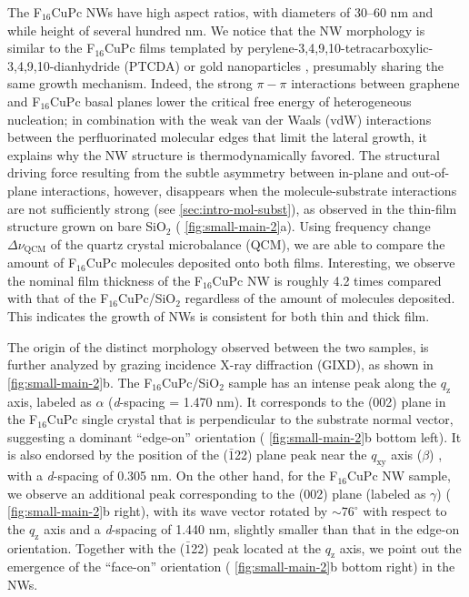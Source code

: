 The F\(_{\text{16}}\)CuPc NWs have high aspect ratios, with diameters of  30--60 nm and while height of  several hundred nm.
%
We notice that the NW morphology is similar to the
F\(_{\text{16}}\)CuPc films templated by
perylene-3,4,9,10-tetracarboxylic-3,4,9,10-dianhydride (PTCDA)
\cite{Yang_2009_F16_PTCDA} or gold nanoparticles
\cite{Mbenkum_2006_F16_1D}, presumably sharing the same growth
mechanism.
%
Indeed, the strong \(\pi-\pi\) interactions between
graphene and F\(_{\text{16}}\)CuPc basal planes lower the critical
free energy of heterogeneous nucleation; in combination with the weak
van der Waals (vdW) interactions between the perfluorinated molecular
edges that limit the lateral growth, it explains why the NW structure
is thermo\-dynamically favored.
%
The structural driving force resulting from the subtle asymmetry
between in-plane and out-of-plane interactions, however, disappears
when the molecule-substrate interactions are not sufficiently strong
(see \autoref{sec:intro-mol-subst}), as observed in the thin-film
structure grown on bare SiO\(_{\text{2}}\) (
\autoref{fig:small-main-2}a).
%
 Using frequency change $\Delta \nu_{\mathrm{QCM}}$ of the quartz crystal
micro\-balance (QCM), we are able to compare the amount of
F$_{\mathrm{16}}$CuPc molecules deposited onto both
films. Interesting, we observe the nominal film thickness of the
F\(_{\text{16}}\)CuPc NW is roughly 4.2 times compared with that of
the F\(_{\text{16}}\)CuPc/SiO\(_{\text{2}}\) regardless of the amount
of molecules deposited. This indicates the growth of NWs is consistent
for both thin and thick film.

The origin of the distinct morphology observed between the two
samples, is further analyzed by grazing incidence X-ray diffraction
(GIXD), as shown in  \autoref{fig:small-main-2}b.
The F\(_{\text{16}}\)CuPc/SiO\(_{\text{2}}\) sample has an intense
peak along the \(q_{\mathrm{z}}\) axis, labeled as \(\alpha\)
(\emph{d}-spacing = 1.470 nm). It corresponds to the (002) plane in the F\(_{\text{16}}\)CuPc single
crystal \cite{Yang_2009_F16_PTCDA} that is perpendicular to the
substrate normal vector, suggesting a dominant ``edge-on'' orientation
( \autoref{fig:small-main-2}b bottom left). It is also endorsed by the
position of the (\(\bar{1}\)22) plane peak near the
\(q_{\mathrm{xy}}\) axis (\(\beta\)) \cite{Yoon_2010_crystal_F16},
with a \emph{d}-spacing of 0.305 nm. On the other hand, for the
F\(_{\text{16}}\)CuPc NW sample, we observe an additional peak
corresponding to the (002) plane (labeled as \(\gamma\)) (
\autoref{fig:small-main-2}b right), with its wave vector rotated by
\(\sim 76^{\circ}\) with respect to the \(q_{\mathrm{z}}\) axis and a
\emph{d}-spacing of 1.440 nm, slightly smaller than that in the
edge-on orientation. Together with the (\(\bar{1}\)22) peak located at
the \(q_{\mathrm{z}}\) axis, we point out the emergence of the
``face-on'' orientation ( \autoref{fig:small-main-2}b bottom right) in
the NWs.


